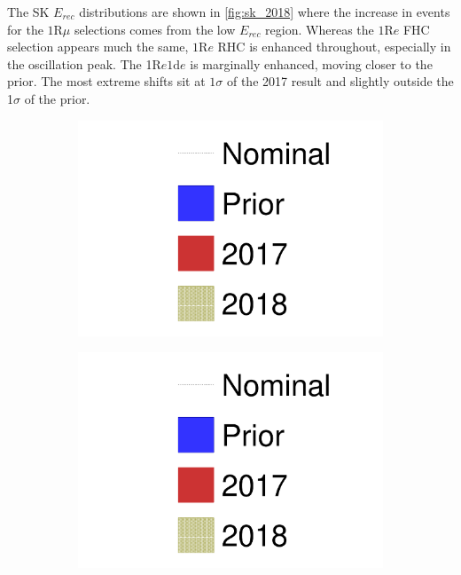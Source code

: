 The SK $E_{rec}$ distributions are shown in \autoref{fig:sk_2018} where the increase in events for the $1\text{R}\mu$ selections comes from the low $E_{rec}$ region. Whereas the $1\text{R}e$ FHC selection appears much the same, $1\text{R}e$ RHC is enhanced throughout, especially in the oscillation peak. The 1$\text{R}e1\text{d}e$ is marginally enhanced, moving closer to the prior. The most extreme shifts sit at $1\sigma$ of the 2017 result and slightly outside the 1$\sigma$ of the prior.
\begin{figure}[h]
	\begin{subfigure}[t]{0.32\textwidth}
		\includegraphics[width=\textwidth, trim={0mm 0mm 0mm 0mm}, clip, page=1]{figures/mach3/2018/data/prior_error_1june_try_2017_fit_on_sk_spectra_2018_results_test_spectra}
	\end{subfigure}
	\begin{subfigure}[t]{0.32\textwidth}
		\includegraphics[width=\textwidth, trim={0mm 0mm 0mm 0mm}, clip, page=5]{figures/mach3/2018/data/prior_error_1june_try_2017_fit_on_sk_spectra_2018_results_test_spectra}

\end{subfigure}
\end{figure}
